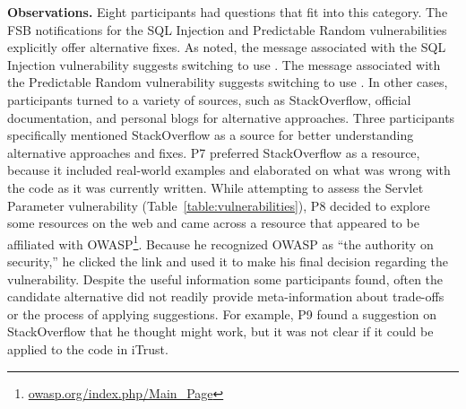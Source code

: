 \documentclass[conference]{IEEEtran}
\begin{document}
\noindent\textbf{Observations.}
Eight participants had questions that fit into this category. 
The FSB notifications for the SQL Injection and Predictable Random vulnerabilities explicitly offer alternative fixes. 
As noted, the message associated with the SQL Injection vulnerability suggests switching to use . 
The message associated with the Predictable Random vulnerability suggests switching to use . 
In other cases, participants turned to a variety of sources, such as StackOverflow, official documentation, and personal blogs for alternative approaches. 
Three participants specifically mentioned StackOverflow as a source for better understanding alternative approaches and fixes. 
P7 preferred StackOverflow as a resource, because it included real-world examples and elaborated on what was wrong with the code as it was currently written.  
While attempting to assess the Servlet Parameter vulnerability (Table~\ref{table:vulnerabilities}), P8 decided to explore some resources on the web and came across a resource that appeared to be affiliated with OWASP\footnote{\url{owasp.org/index.php/Main_Page}}. 
Because he recognized OWASP as ``the authority on security,'' he clicked the link and used it to make his final decision regarding the vulnerability. 
Despite the useful information some participants found, often the candidate alternative did not readily provide meta-information about trade-offs or the process of applying suggestions. 
For example, P9 found a suggestion on StackOverflow that he thought might work, but it was not clear if it could be applied to the code in iTrust. 
\\



\end{document}
